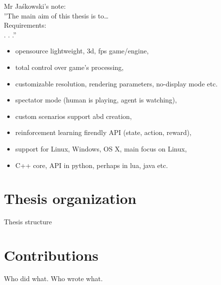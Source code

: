 Mr Jaśkowski's note:\\
''The main aim of this thesis is to…\\
Requirements:\\
. . .''
\begin{itemize}
	\item opensource lightweight, 3d, fps game/engine,
	\item total control over game's processing,
	\item customizable resolution, rendering parameters, no-display mode etc.
	\item spectator mode (human is playing, agent is watching),
	\item custom scenarios support abd creation,
	\item reinforcement learning firendly API (state, action, reward),
	\item support for Linux, Windows, OS X, main focus on Linux,
	\item C++ core, API in python, perhaps in lua, java etc.
\end{itemize}
	
\section{Thesis organization}
Thesis structure

\section{Contributions}
Who did what.
Who wrote what.
